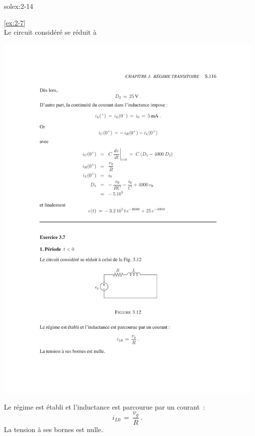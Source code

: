 \begin{exwithsol}{solex:2-14}
\begin{solexercise}{\ref{ex:2-7}}
	\label{solex:2-7}
\\
Le circuit consid\'er\'e se r\'eduit \`a
\begin{center}
	\includegraphics[width=\linewidth]{sol_exercices/ex3-7-1}
\end{center}
Le r\'egime est \'etabli et l'inductance est parcourue par un courant~:
\[ i_{L0} \, = \, \dfrac{v_g}{R}~. \]
La tension \`a ses bornes est nulle.


\end{solexercise}
\end{exwithsol}
